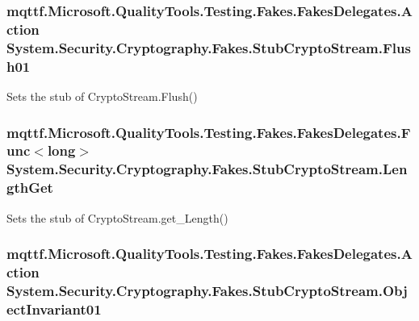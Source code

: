 \hypertarget{class_system_1_1_security_1_1_cryptography_1_1_fakes_1_1_stub_crypto_stream_aa54e1b966931a70fbd6e966be990f4ca}{
\subsubsection[{Flush01}]{\setlength{\rightskip}{0pt plus 5cm}mqttf.\-Microsoft.\-Quality\-Tools.\-Testing.\-Fakes.\-Fakes\-Delegates.\-Action System.\-Security.\-Cryptography.\-Fakes.\-Stub\-Crypto\-Stream.\-Flush01}}\label{class_system_1_1_security_1_1_cryptography_1_1_fakes_1_1_stub_crypto_stream_aa54e1b966931a70fbd6e966be990f4ca}


Sets the stub of Crypto\-Stream.\-Flush()

\hypertarget{class_system_1_1_security_1_1_cryptography_1_1_fakes_1_1_stub_crypto_stream_a598a41dd576e8ba747c1f0b4dc11b6ce}{
\subsubsection[{Length\-Get}]{\setlength{\rightskip}{0pt plus 5cm}mqttf.\-Microsoft.\-Quality\-Tools.\-Testing.\-Fakes.\-Fakes\-Delegates.\-Func$<$long$>$ System.\-Security.\-Cryptography.\-Fakes.\-Stub\-Crypto\-Stream.\-Length\-Get}}\label{class_system_1_1_security_1_1_cryptography_1_1_fakes_1_1_stub_crypto_stream_a598a41dd576e8ba747c1f0b4dc11b6ce}


Sets the stub of Crypto\-Stream.\-get\-\_\-\-Length()

\hypertarget{class_system_1_1_security_1_1_cryptography_1_1_fakes_1_1_stub_crypto_stream_a128a26d4a73808cd013d10bbcc94adf0}{
\subsubsection[{Object\-Invariant01}]{\setlength{\rightskip}{0pt plus 5cm}mqttf.\-Microsoft.\-Quality\-Tools.\-Testing.\-Fakes.\-Fakes\-Delegates.\-Action System.\-Security.\-Cryptography.\-Fakes.\-Stub\-Crypto\-Stream.\-Object\-Invariant01}}\label{class_system_1_1_security_1_1_cryptography_1_1_fakes_1_1_stub_crypto_stream_a128a26d4a73808cd013d10bbcc94adf0}



